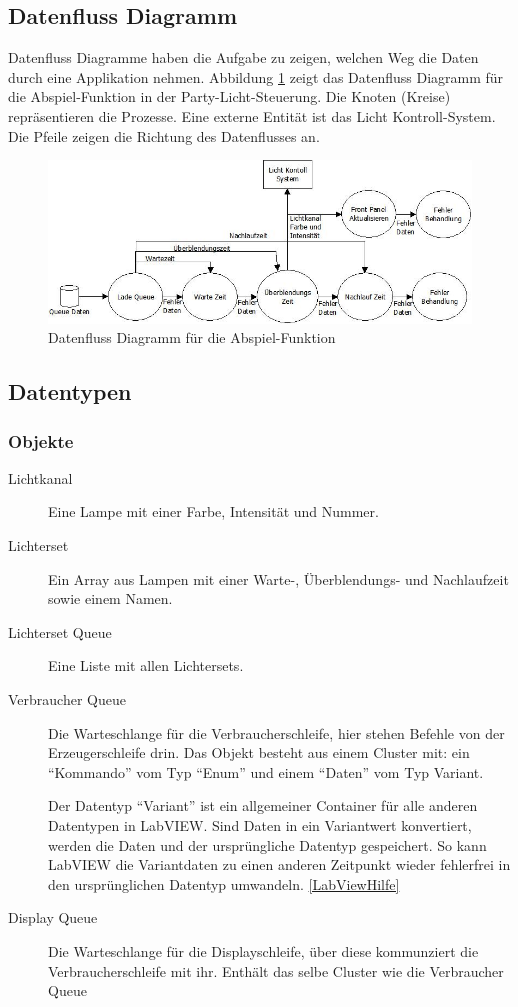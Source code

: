 \subsection{Datenfluss Diagramm}
Datenfluss Diagramme haben die Aufgabe zu zeigen, welchen Weg die Daten durch eine Applikation nehmen. Abbildung \ref{fig:plan02} zeigt das Datenfluss Diagramm für die Abspiel-Funktion in der Party-Licht-Steuerung. Die Knoten (Kreise) repräsentieren die Prozesse. Eine externe Entität ist das Licht Kontroll-System. Die Pfeile zeigen die Richtung des Datenflusses an.
	\begin{figure}[h!]
	\centering
		\includegraphics[width=\textwidth]{Pics/play-dataflow.jpeg}
	\caption{Datenfluss Diagramm für die Abspiel-Funktion}
	\label{fig:plan02}
	\end{figure}	

\subsection{Datentypen}

\subsubsection{Objekte}
\begin{description}
\item[Lichtkanal]Eine Lampe mit einer Farbe, Intensität und Nummer.
\item[Lichterset]Ein Array aus Lampen mit einer Warte-, Überblendungs- und Nachlaufzeit sowie einem Namen.
\item[Lichterset Queue] Eine Liste mit allen Lichtersets.

\item[Verbraucher Queue]Die Warteschlange für die Verbraucherschleife, hier stehen Befehle von der Erzeugerschleife drin. 
Das Objekt besteht aus einem Cluster mit: ein "`Kommando"' vom Typ "`Enum"' und einem "`Daten"' vom Typ Variant.

Der Datentyp "`Variant"' ist ein allgemeiner Container für alle anderen Datentypen in LabVIEW. Sind Daten in ein Variantwert konvertiert, werden die Daten und der ursprüngliche Datentyp gespeichert. So kann LabVIEW die Variantdaten zu einen anderen Zeitpunkt wieder fehlerfrei in den ursprünglichen Datentyp umwandeln. \ref{LabViewHilfe}

\item[Display Queue]Die Warteschlange für die Displayschleife, über diese kommunziert die Verbraucherschleife mit ihr. Enthält das selbe Cluster wie die Verbraucher Queue

\end{description}


